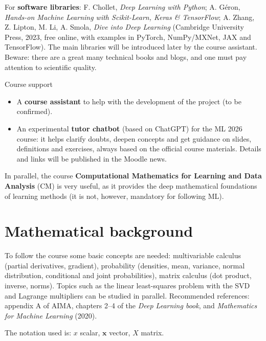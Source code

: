 For \textbf{software libraries}: F. Chollet, \emph{Deep Learning with
Python}; A. Géron, \emph{Hands-on Machine Learning with Scikit-Learn,
Keras \& TensorFlow}; A. Zhang, Z. Lipton, M. Li, A. Smola, \emph{Dive
into Deep Learning} (Cambridge University Press, 2023, free online,
with examples in PyTorch, NumPy/MXNet, JAX and TensorFlow). The main
libraries will be introduced later by the course assistant. Beware:
there are a great many technical books and blogs, and one must pay
attention to scientific quality.

\begin{boxnote}{Course support}

\begin{itemize}
\tightlist
\item
  A \textbf{course assistant} to help with the development of the
  project (to be confirmed).
\item
  An experimental \textbf{tutor chatbot} (based on ChatGPT) for the ML
  2026 course: it helps clarify doubts, deepen concepts and get
  guidance on slides, definitions and exercises, always based on the
  official course materials. Details and links will be published in
  the Moodle news.
\end{itemize}

\end{boxnote}

In parallel, the course \textbf{Computational Mathematics for Learning
and Data Analysis} (CM) is very useful, as it provides the deep
mathematical foundations of learning methods (it is not, however,
mandatory for following ML).

\section{Mathematical background}\label{richiami-matematici}

To follow the course some basic concepts are needed: multivariable
calculus (partial derivatives, gradient), probability (densities, mean,
variance, normal distribution, conditional and joint probabilities),
matrix calculus (dot product, inverse, norms). Topics such as the
linear least-squares problem with the SVD and Lagrange multipliers can
be studied in parallel. Recommended references: appendix A of AIMA,
chapters 2--4 of the \emph{Deep Learning book}, and \emph{Mathematics
for Machine Learning} (2020).

The notation used is: \(x\) scalar, \(\mathbf{x}\) vector, \(X\)
matrix.

